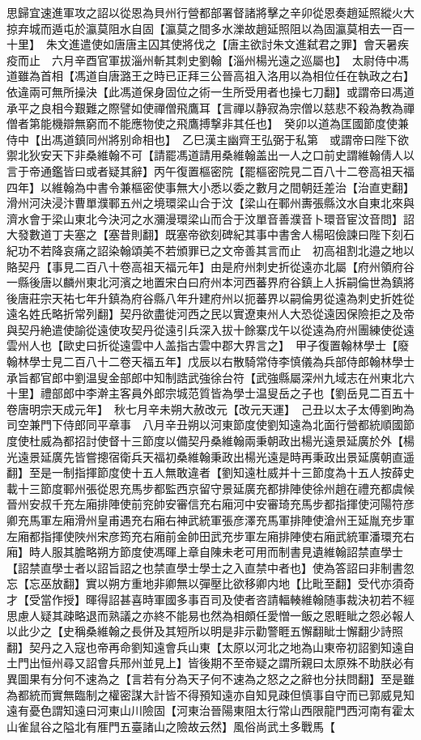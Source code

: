 思歸宜速進軍攻之詔以從恩為貝州行營都部署督諸將擊之辛卯從恩奏趙延照縱火大掠弃城而遁屯於瀛莫阻水自固【瀛莫之間多水濼故趙延照阻以為固瀛莫相去一百一十里】　朱文進遣使如唐唐主囚其使將伐之【唐主欲討朱文進弑君之罪】會天暑疾疫而止　六月辛酉官軍拔淄州斬其刺史劉翰【淄州楊光遠之巡屬也】　太尉侍中馮道雖為首相【馮道自唐潞王之時已正拜三公晉高祖入洛用以為相位任在執政之右】依違兩可無所操決【此馮道保身固位之術一生所受用者也操七刀翻】或謂帝曰馮道承平之良相今艱難之際譬如使禪僧飛鷹耳【言禪以静寂為宗僧以慈悲不殺為教為禪僧者第能機辯無窮而不能應物使之飛鷹搏撃非其任也】　癸卯以道為匡國節度使兼侍中【出馮道鎮同州將别命相也】　乙巳漢主幽齊王弘弼于私第　或謂帝曰陛下欲禦北狄安天下非桑維翰不可【請罷馮道請用桑維翰盖出一人之口前史謂維翰倩人以言于帝通鑑皆曰或者疑其辭】丙午復置樞密院【罷樞密院見二百八十二卷高祖天福四年】以維翰為中書令兼樞密使事無大小悉以委之數月之間朝廷差治【治直吏翻】　滑州河決浸汴曹單濮鄆五州之境環梁山合于汶【梁山在鄆州夀張縣汶水自東北來與濟水會于梁山東北今決河之水瀰漫環梁山而合于汶單音善濮音卜環音宦汶音問】詔大發數道丁夫塞之【塞昔則翻】既塞帝欲刻碑紀其事中書舍人楊昭儉諫曰陛下刻石紀功不若降哀痛之詔染翰頌美不若頒罪已之文帝善其言而止　初高祖割北邉之地以賂契丹【事見二百八十卷高祖天福元年】由是府州刺史折從遠亦北屬【府州領府谷一縣後唐以麟州東北河濱之地置宋白曰府州本河西蕃界府谷鎮上人拆嗣倫世為鎮將後唐莊宗天祐七年升鎮為府谷縣八年升建府州以扼蕃界以嗣倫男從遠為刺史折姓從遠名姓氏略折常列翻】契丹欲盡徙河西之民以實遼東州人大恐從遠因保險拒之及帝與契丹絶遣使諭從遠使攻契丹從遠引兵深入拔十餘寨戊午以從遠為府州團練使從遠雲州人也【歐史曰折從遠雲中人盖指古雲中郡大界言之】　甲子復置翰林學士【廢翰林學士見二百八十二卷天福五年】戊辰以右散騎常侍李慎儀為兵部侍郎翰林學士承旨都官郎中劉温叟金部郎中知制誥武強徐台符【武強縣屬深州九域志在州東北六十里】禮部郎中李澣主客員外郎宗城范質皆為學士温叟岳之子也【劉岳見二百五十卷唐明宗天成元年】　秋七月辛未朔大赦改元【改元天運】　己丑以太子太傅劉昫為司空兼門下侍郎同平章事　八月辛丑朔以河東節度使劉知遠為北面行營都統順國節度使杜威為都招討使督十三節度以備契丹桑維翰兩秉朝政出楊光遠景延廣於外【楊光遠景延廣先皆嘗摠宿衛兵天福初桑維翰秉政出楊光遠是時再秉政出景延廣朝直遥翻】至是一制指揮節度使十五人無敢違者【劉知遠杜威并十三節度為十五人按薛史載十三節度鄆州張從恩充馬步都監西京留守景延廣充都排陣使徐州趙在禮充都虞候晉州安叔千充左廂排陣使前兖帥安審信充右廂河中安審琦充馬步都指揮使河陽符彦卿充馬軍左廂滑州皇甫遇充右廂右神武統軍張彦澤充馬軍排陣使滄州王延胤充步軍左廂都指揮使陜州宋彦筠充右廂前金帥田武充步軍左廂排陣使右廂武統軍潘環充右廂】時人服其膽略朔方節度使馮暉上章自陳未老可用而制書見遺維翰詔禁直學士【詔禁直學士者以詔旨詔之也禁直學士學士之入直禁中者也】使為答詔曰非制書忽忘【忘巫放翻】實以朔方重地非卿無以彈壓比欲移卿内地【比毗至翻】受代亦須奇才【受當作授】暉得詔甚喜時軍國多事百司及使者咨請輻輳維翰随事裁決初若不經思慮人疑其疎略退而熟議之亦終不能易也然為相頗任愛憎一飯之恩睚眦之怨必報人以此少之【史稱桑維翰之長併及其短所以明是非示勸警睚五懈翻眦士懈翻少詩照翻】契丹之入寇也帝再命劉知遠會兵山東【太原以河北之地為山東帝初詔劉知遠自土門出恒州尋又詔會兵邢州並見上】皆後期不至帝疑之謂所親曰太原殊不助朕必有異圖果有分何不速為之【言若有分為天子何不速為之怒之之辭也分扶問翻】至是雖為都統而實無臨制之權密謀大計皆不得預知遠亦自知見疎但慎事自守而已郭威見知遠有憂色謂知遠曰河東山川險固【河東治晉陽東阻太行常山西限龍門西河南有霍太山雀鼠谷之隘北有㕍門五臺諸山之險故云然】風俗尚武土多戰馬【